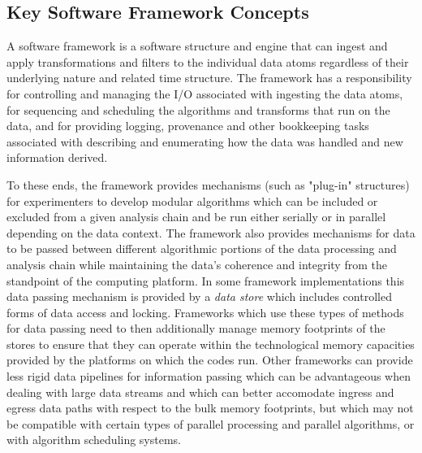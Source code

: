 \documentclass[../main-v1.tex]{subfiles}
\begin{document}
\subsection{Key Software Framework Concepts}

A software framework is a software structure and engine that can ingest and apply transformations and filters to the individual data atoms regardless of their underlying nature and related time structure.  The framework has a responsibility for controlling and managing the I/O associated with ingesting the data atoms, for sequencing and scheduling the algorithms and transforms that run on the data, and for providing logging, provenance and other bookkeeping tasks associated with describing and enumerating how the data was handled and new information derived.  

To these ends, the framework provides mechanisms (such as "plug-in" structures) for experimenters to develop modular algorithms which can be included or excluded from a given analysis chain and be run either serially or in parallel depending on the data context.  The framework also provides mechanisms for data to be passed between different algorithmic portions of the data processing and analysis chain while maintaining the data's coherence and integrity from the standpoint of the computing platform.  In some framework implementations this data passing mechanism is provided by a {\it data store} which includes controlled forms of data access and locking.  
Frameworks which use these types of methods for data passing need to then additionally manage memory footprints of the stores to ensure that they can operate within the technological memory capacities provided by the platforms on which the codes run.  Other frameworks can provide less rigid data pipelines for information passing which can be advantageous when dealing with large data streams and which can better accomodate ingress and egress data paths with respect to the bulk memory footprints, but which may not be compatible with certain types of parallel processing and parallel algorithms, or with algorithm scheduling systems.
\end{document}
